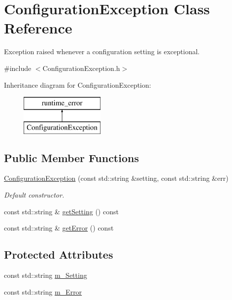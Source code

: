 \hypertarget{class_configuration_exception}{}\section{Configuration\+Exception Class Reference}
\label{class_configuration_exception}


Exception raised whenever a configuration setting is exceptional.  




{\ttfamily \#include $<$Configuration\+Exception.\+h$>$}

Inheritance diagram for Configuration\+Exception\+:\begin{figure}[H]
\begin{center}
\leavevmode
\includegraphics[height=2.000000cm]{class_configuration_exception}
\end{center}
\end{figure}
\subsection*{Public Member Functions}
\begin{DoxyCompactItemize}
\item 
\hyperlink{class_configuration_exception_aafdad5d128d9af78d608ef84bdadefae}{Configuration\+Exception} (const std\+::string \&setting, const std\+::string \&err)
\begin{DoxyCompactList}\small\item\em Default constructor. \end{DoxyCompactList}\item 
const std\+::string \& \hyperlink{class_configuration_exception_abdd1f89e64ba00cf95bf0486f9f79996}{get\+Setting} () const 
\item 
const std\+::string \& \hyperlink{class_configuration_exception_a3977f23c22371c3bc9a9e564afc7778c}{get\+Error} () const 
\end{DoxyCompactItemize}
\subsection*{Protected Attributes}
\begin{DoxyCompactItemize}
\item 
const std\+::string \hyperlink{class_configuration_exception_a5ed87e962e3bb847b29a86b5460b9370}{m\+\_\+\+Setting}
\item 
const std\+::string \hyperlink{class_configuration_exception_a0d142ec503a6f32470c6d262af2d1298}{m\+\_\+\+Error}
\end{DoxyCompactItemize}


